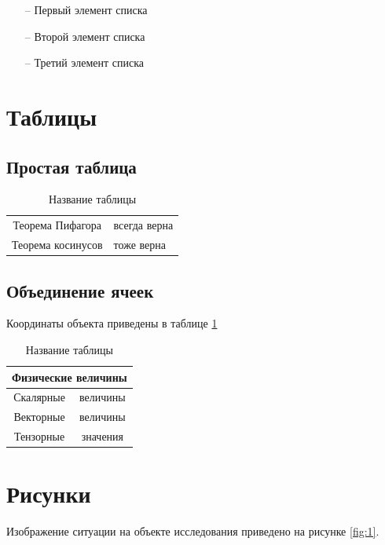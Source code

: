 \documentclass[a4paper,12pt]{article}
\begin{document}
\begin{itemize}
    \item[--] Первый элемент списка
    \item[--] Второй элемент списка
    \item[--] Третий элемент списка
\end{itemize}

\section{Таблицы} 
\subsection*{Простая таблица} 
\begin{table}[h]
    \centering
    \caption{Название таблицы}
    \begin{tabular}{||c|l||}
        \hline
        Теорема Пифагора & всегда верна \\
        Теорема косинусов & тоже верна \\
        \hline
    \end{tabular}
    \label{tab:1}
\end{table}
\subsection*{Объединение ячеек} 

Координаты объекта приведены в таблице \ref{tab:1}

\begin{table}[h]
    \centering
    \caption{Название таблицы}
    \begin{tabular}{|c|c|}
        \hline
        \multicolumn{2}{|c|}{Физические величины} \\
        \hline
        Скалярные & величины \\
        \hline
        Векторные & величины \\
        \hline
        Тензорные & значения \\
        \hline
    \end{tabular}
    \label{tab:2}
\end{table}

\section{Рисунки}
Изображение ситуации на объекте исследования приведено на рисунке \ref{fig:1}.
\end{document}
